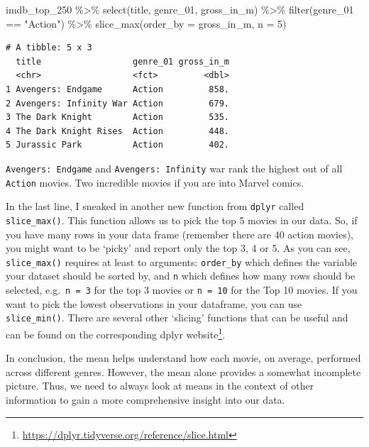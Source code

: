 \documentclass[
  letterpaper,
]{krantz}
\makeatletter
\newenvironment{Shaded}{\begin{snugshade}}{\end{snugshade}}
\newcommand{\AttributeTok}[1]{\textcolor[rgb]{0.40,0.45,0.13}{#1}}
\newcommand{\DecValTok}[1]{\textcolor[rgb]{0.68,0.00,0.00}{#1}}
\newcommand{\FunctionTok}[1]{\textcolor[rgb]{0.28,0.35,0.67}{#1}}
\newcommand{\NormalTok}[1]{\textcolor[rgb]{0.00,0.23,0.31}{#1}}
\newcommand{\SpecialCharTok}[1]{\textcolor[rgb]{0.37,0.37,0.37}{#1}}
\newcommand{\StringTok}[1]{\textcolor[rgb]{0.13,0.47,0.30}{#1}}
\renewcommand{\href}[2]{#2\footnote{\url{#1}}}
\newenvironment{kframe}{%
\medskip{}
\setlength{\fboxsep}{.8em}
 \def\at@end@of@kframe{}%
 \ifinner\ifhmode%
  \def\at@end@of@kframe{\end{minipage}}%
  \begin{minipage}{\columnwidth}%
 \fi\fi%
 \def\FrameCommand##1{\hskip\@totalleftmargin \hskip-\fboxsep
 \colorbox{shadecolor}{##1}\hskip-\fboxsep
     \hskip-\linewidth \hskip-\@totalleftmargin \hskip\columnwidth}%
 \MakeFramed {\advance\hsize-\width
   \@totalleftmargin\z@ \linewidth\hsize
   \@setminipage}}%
 {\par\unskip\endMakeFramed%
 \at@end@of@kframe}
\renewenvironment{Shaded}{\begin{kframe}}{\end{kframe}}
\makeatother
\begin{document}
\begin{Shaded}
\begin{Highlighting}[]
\NormalTok{imdb\_top\_250 }\SpecialCharTok{\%\textgreater{}\%}
  \FunctionTok{select}\NormalTok{(title, genre\_01, gross\_in\_m) }\SpecialCharTok{\%\textgreater{}\%}
  \FunctionTok{filter}\NormalTok{(genre\_01 }\SpecialCharTok{==} \StringTok{"Action"}\NormalTok{) }\SpecialCharTok{\%\textgreater{}\%}
  \FunctionTok{slice\_max}\NormalTok{(}\AttributeTok{order\_by =}\NormalTok{ gross\_in\_m,}
            \AttributeTok{n =} \DecValTok{5}\NormalTok{)}
\end{Highlighting}
\end{Shaded}

\begin{verbatim}
# A tibble: 5 x 3
  title                  genre_01 gross_in_m
  <chr>                  <fct>         <dbl>
1 Avengers: Endgame      Action         858.
2 Avengers: Infinity War Action         679.
3 The Dark Knight        Action         535.
4 The Dark Knight Rises  Action         448.
5 Jurassic Park          Action         402.
\end{verbatim}

\texttt{Avengers:\ Endgame} and \texttt{Avengers:\ Infinity} war rank
the highest out of all \texttt{Action} movies. Two incredible movies if
you are into Marvel comics.

In the last line, I sneaked in another new function from \texttt{dplyr}
called \texttt{slice\_max()}. This function allows us to pick the top 5
movies in our data. So, if you have many rows in your data frame
(remember there are 40 action movies), you might want to be `picky' and
report only the top 3, 4 or 5. As you can see, \texttt{slice\_max()}
requires at least to arguments: \texttt{order\_by} which defines the
variable your dataset should be sorted by, and \texttt{n} which defines
how many rows should be selected, e.g.~\texttt{n\ =\ 3} for the top 3
movies or \texttt{n\ =\ 10} for the Top 10 movies. If you want to pick
the lowest observations in your dataframe, you can use
\texttt{slice\_min()}. There are several other `slicing' functions that
can be useful and can be found on the corresponding
\href{https://dplyr.tidyverse.org/reference/slice.html}{dplyr website}.

In conclusion, the mean helps understand how each movie, on average,
performed across different genres. However, the mean alone provides a
somewhat incomplete picture. Thus, we need to always look at means in
the context of other information to gain a more comprehensive insight
into our data.
\end{document}
